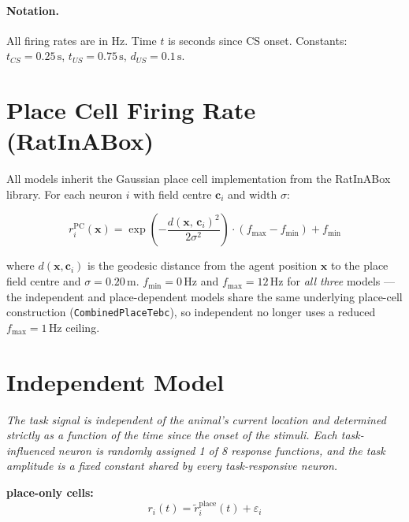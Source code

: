 \documentclass{article}
\begin{document}
\paragraph{Notation.} All firing rates are in Hz. Time $t$ is seconds since CS onset.
Constants: $t_{CS} = 0.25\,\text{s}$, $t_{US} = 0.75\,\text{s}$, $d_{US} = 0.1\,\text{s}$.

\section{Place Cell Firing Rate (RatInABox)}

All models inherit the Gaussian place cell implementation from the RatInABox library.
For each neuron $i$ with field centre $\mathbf{c}_i$ and width $\sigma$:

\begin{equation}
    r^{\mathrm{PC}}_i(\mathbf{x}) =
        \exp\!\left(-\frac{d(\mathbf{x},\,\mathbf{c}_i)^2}{2\sigma^2}\right)
        \cdot (f_{\max} - f_{\min}) + f_{\min}
\end{equation}

\noindent
where $d(\mathbf{x}, \mathbf{c}_i)$ is the geodesic distance from the agent position
$\mathbf{x}$ to the place field centre and $\sigma = 0.20\,\text{m}$.
$f_{\min} = 0\,\text{Hz}$ and $f_{\max} = 12\,\text{Hz}$ for \emph{all three} models ---
the independent and place-dependent models share the same underlying place-cell
construction (\texttt{CombinedPlaceTebc}), so independent no longer uses a reduced
$f_{\max}=1\,\text{Hz}$ ceiling.

\section{Independent Model}

\textit{The task signal is independent of the animal's current location and determined
strictly as a function of the time since the onset of the stimuli. Each task-influenced
neuron is randomly assigned 1 of 8 response functions, and the task amplitude is a
fixed constant shared by every task-responsive neuron.}

\bigskip\noindent
\textbf{place-only cells:}
\begin{equation}
    r_i(t) = \tilde{r}^{\mathrm{place}}_i(t) + \varepsilon_i
\end{equation}
\end{document}
